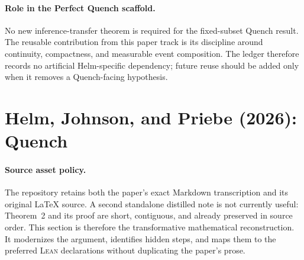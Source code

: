 \documentclass[11pt]{article}
\newcommand{\Lean}{\textsc{Lean}}
\begin{document}
\paragraph{Role in the Perfect Quench scaffold.}
No new inference-transfer theorem is required for the fixed-subset Quench
result.  The reusable contribution from this paper track is its discipline
around continuity, compactness, and measurable event composition.  The ledger
therefore records no artificial Helm-specific dependency; future reuse should
be added only when it removes a Quench-facing hypothesis.

\section{Helm, Johnson, and Priebe (2026): Quench}

\paragraph{Source asset policy.}
The repository retains both the paper's exact Markdown transcription and its
original \LaTeX{} source.  A second standalone distilled note is not currently
useful: Theorem~2 and its proof are short, contiguous, and already preserved in
source order.  This section is therefore the transformative mathematical
reconstruction.  It modernizes the argument, identifies hidden steps, and maps
them to the preferred \Lean{} declarations without duplicating the paper's
prose.
\end{document}
